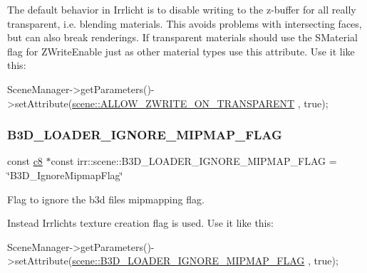 The default behavior in Irrlicht is to disable writing to the z-\/buffer for all really transparent, i.\+e. blending materials. This avoids problems with intersecting faces, but can also break renderings. If transparent materials should use the S\+Material flag for Z\+Write\+Enable just as other material types use this attribute. Use it like this\+: 
\begin{DoxyCode}
SceneManager->getParameters()->setAttribute(\hyperlink{namespaceirr_1_1scene_af832ed60e4bbf0141da174a9163bd681}{scene::ALLOW\_ZWRITE\_ON\_TRANSPARENT}
      , \textcolor{keyword}{true});
\end{DoxyCode}
 \mbox{\label{namespaceirr_1_1scene_a8ffd431b36471ace9942d0693658076c}} 
\subsubsection{\texorpdfstring{B3\+D\+\_\+\+L\+O\+A\+D\+E\+R\+\_\+\+I\+G\+N\+O\+R\+E\+\_\+\+M\+I\+P\+M\+A\+P\+\_\+\+F\+L\+AG}{B3D\_LOADER\_IGNORE\_MIPMAP\_FLAG}}
{\footnotesize\ttfamily const \hyperlink{namespaceirr_a9395eaea339bcb546b319e9c96bf7410}{c8} $\ast$const irr\+::scene\+::\+B3\+D\+\_\+\+L\+O\+A\+D\+E\+R\+\_\+\+I\+G\+N\+O\+R\+E\+\_\+\+M\+I\+P\+M\+A\+P\+\_\+\+F\+L\+AG = \char`\"{}B3\+D\+\_\+\+Ignore\+Mipmap\+Flag\char`\"{}}



Flag to ignore the b3d file\textquotesingle{}s mipmapping flag. 

Instead Irrlicht\textquotesingle{}s texture creation flag is used. Use it like this\+: 
\begin{DoxyCode}
SceneManager->getParameters()->setAttribute(\hyperlink{namespaceirr_1_1scene_a8ffd431b36471ace9942d0693658076c}{scene::B3D\_LOADER\_IGNORE\_MIPMAP\_FLAG}
      , \textcolor{keyword}{true});
\end{DoxyCode}
 \mbox{\label{namespaceirr_1_1scene_aa2ba7f6fbb42b33a21e4083a85772b1b}} 
